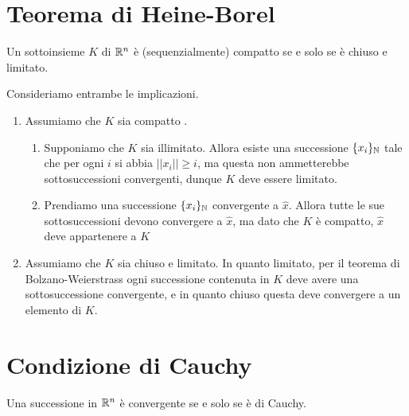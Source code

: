 \documentclass[openany]{book}
\begin{document}
\section{Teorema di Heine-Borel}
\begin{theorem}{}{}
    Un sottoinsieme $K$ di $\mathbb{R}^n$ è (sequenzialmente) compatto se e solo se è chiuso e limitato.
\end{theorem}
 Consideriamo entrambe le implicazioni.
    \begin{enumerate}
        \item Assumiamo che $K$ sia compatto .\begin{enumerate}
            \item Supponiamo che $K$ sia illimitato. Allora esiste una successione $\{x_i\}_{\mathbb{N}}$ tale che per ogni $i$ si abbia $||x_i||\ge i$, ma questa non ammetterebbe sottosuccessioni convergenti, dunque $K$ deve essere limitato.
            \item Prendiamo una successione $\{x_i\}_{\mathbb{N}}$ convergente a $\hat{x}$. Allora tutte le sue sottosuccessioni devono convergere a $\hat{x}$, ma dato che $K$ è compatto, $\hat{x}$ deve appartenere a $K$
        \end{enumerate}
        \item Assumiamo che $K$ sia chiuso e limitato. In quanto limitato, per il teorema di Bolzano-Weierstrass ogni successione contenuta in $K$ deve avere una sottosuccessione convergente, e in quanto chiuso questa deve convergere a un elemento di $K$.
    \end{enumerate}


\section{Condizione di Cauchy}

\begin{theorem}{}{}
    Una successione in $\mathbb{R}^n$ è convergente se e solo se è di Cauchy.
\end{theorem}
\end{document}
